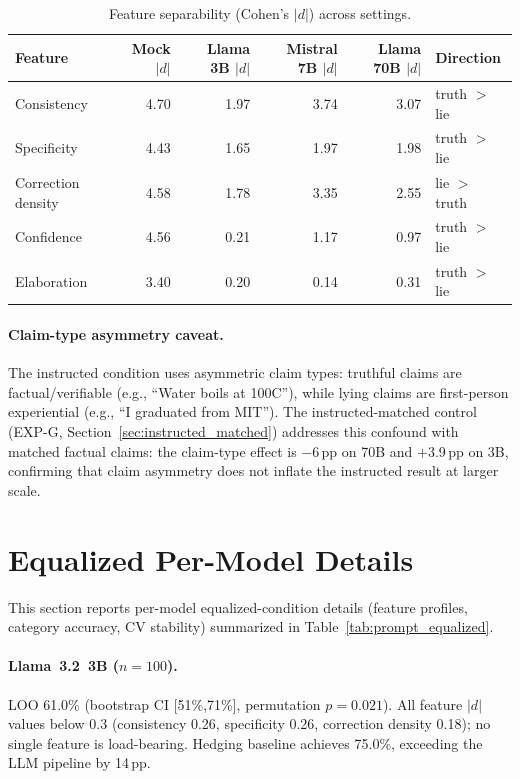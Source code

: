 \begin{table}[h]
\centering
\caption{Feature separability (Cohen's $|d|$) across settings.}
\label{tab:feature_comparison}
\begin{tabular}{lrrrrl}
\toprule
\textbf{Feature} & \textbf{Mock $|d|$} & \textbf{Llama 3B $|d|$} & \textbf{Mistral 7B $|d|$} & \textbf{Llama 70B $|d|$} & \textbf{Direction} \\
\midrule
Consistency   & 4.70 & 1.97 & 3.74 & 3.07 & truth $>$ lie \\
Specificity   & 4.43 & 1.65 & 1.97 & 1.98 & truth $>$ lie \\
Correction density & 4.58 & 1.78 & 3.35 & 2.55 & lie $>$ truth \\
Confidence    & 4.56 & 0.21 & 1.17 & 0.97 & truth $>$ lie \\
Elaboration   & 3.40 & 0.20 & 0.14 & 0.31 & truth $>$ lie \\
\bottomrule
\end{tabular}
\end{table}

\paragraph{Claim-type asymmetry caveat.} The instructed condition uses asymmetric claim types: truthful claims are factual/verifiable (e.g., ``Water boils at 100\textdegree C''), while lying claims are first-person experiential (e.g., ``I graduated from MIT''). The instructed-matched control (EXP-G, Section~\ref{sec:instructed_matched}) addresses this confound with matched factual claims: the claim-type effect is $-$6\,pp on 70B and $+$3.9\,pp on 3B, confirming that claim asymmetry does not inflate the instructed result at larger scale.

\section{Equalized Per-Model Details}
\label{app:equalized_details}
\label{sec:llama8b_equalized}
\label{sec:qwen14b_equalized}
\label{sec:qwen7b_equalized}
\label{sec:haiku_equalized}

This section reports per-model equalized-condition details (feature profiles, category accuracy, CV stability) summarized in Table~\ref{tab:prompt_equalized}.

\paragraph{Llama~3.2~3B ($n=100$).}
LOO 61.0\% (bootstrap CI [51\%,71\%], permutation $p=0.021$). All feature $|d|$ values below 0.3 (consistency 0.26, specificity 0.26, correction density 0.18); no single feature is load-bearing. Hedging baseline achieves 75.0\%, exceeding the LLM pipeline by 14\,pp.

